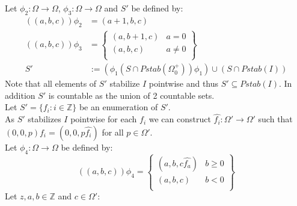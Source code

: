 \documentclass{report}
\begin{document}
Let $\phi_2:\Omega \rightarrow \Omega$, $\phi_3:\Omega \rightarrow \Omega$ and $S'$ be defined by:
\begin{align*}
((a,b,c))\phi_2&=(a+1,b,c)\\
((a,b,c))\phi_3&=
 \left\{
    \begin{array}{lr}
      (a,b+1,c)&  a=0 \\
     (a,b,c)&  a \neq 0\\
    \end{array}
    \right\}\\
S' &:= (\phi_1(S \cap Pstab(\Omega_0^+))\phi_1)\cup (S \cap Pstab(I))
\end{align*}
Note that all elements of $S'$ stabilize $I$ pointwise and thus $S' \subseteq Pstab(I)$. In addition $S'$ is countable as the union of 2 countable sets.\\
Let $S' = \{f_i: i \in \mathbb{Z}\}$ be an enumeration of $S'$.\\
As $S'$ stabilizes $I$ pointwise for each $f_i$ we can construct $\hat{f_i}:\Omega' \rightarrow \Omega'$ such that $(0,0,p)f_i=(0,0,p\hat{f_i})$ for all $p \in \Omega'$.\\
Let $\phi_4: \Omega \rightarrow \Omega$ be defined by:
\[((a,b,c))\phi_4= \left\{
    \begin{array}{lr}
      (a,b,c\hat{f_a})&  b\geq 0 \\
     (a,b,c)&  b<0\\
    \end{array}
    \right\}\]
Let $z,a,b \in \mathbb{Z}$ and $c \in \Omega'$:
\end{document}
